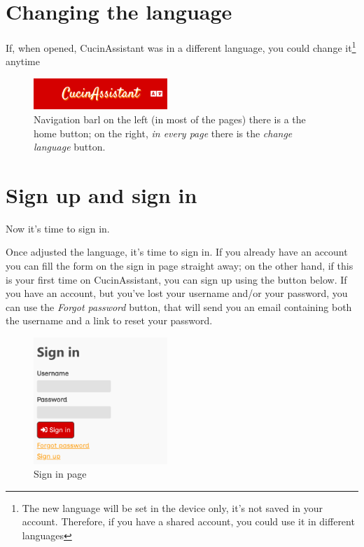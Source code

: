\documentclass[12pt, a4paper]{report}
\begin{document}
    \section{Changing the language}

    If, when opened, CucinAssistant was in a different language, you could change it\footnote{The new language
    will be set in the device only, it's not saved in your account. Therefore, if you have a shared account, you
    could use it in different languages} anytime 

    \begin{figure}[H]
        \centering
        \includegraphics[width=0.45\textwidth]{assets/nav.png}
        \caption{Navigation barl on the left (in most of the pages) there is a the home button; on the right, \emph{in every page} there
        is the \emph{change language} button.}
    \end{figure}

    \section{Sign up and sign in}

    Now it's time to sign in.

    Once adjusted the language, it's time to sign in.
    If you already have an account you can fill the form on the sign in page straight away; on the other hand, if this is your first
    time on CucinAssistant, you can sign up using the button below.
    If you have an account, but you've lost your username and/or your password, you can use the \emph{Forgot password} button, that will
    send you an email containing both the username and a link to reset your password.

    \begin{figure}[H]
        \centering
        \includegraphics[width=0.45\textwidth]{assets/en/signin.png}
        \caption{Sign in page}
    \end{figure}
\end{document}
